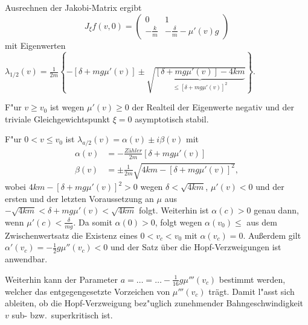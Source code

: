 \documentclass[a4paper, 13pt]{scrreprt}
\theoremstyle{definition} \newtheorem{definition}{Definition}[section]
\newenvironment{beispiel}[1][Beispiel]{\begin{trivlist}
\item[\hskip \labelsep {\bfseries #1}]}{\end{trivlist}}
\begin{document}
\begin{beispiel}[Reibschwinger aus der Mechanik]
Ausrechnen der Jakobi-Matrix ergibt
\[
J_\xi f(v,0)=\begin{pmatrix}
0 & 1\\
-\frac{k}{m} & -\frac{\delta}{m}-\mu'(v)g
\end{pmatrix}
\]
mit Eigenwerten $\lambda_{1\slash2}(v)=\frac{1}{2m}\left\{-[\delta+mg\mu'(v)]\pm\sqrt{\underbrace{[\delta+mg\mu'(v)]-4km}_{\leq[\delta+mg\mu'(v)]^2}}\right\}$.

F"ur $v\geq v_0$ ist wegen $\mu'(v)\geq0$ der Realteil der Eigenwerte negativ und der triviale Gleichgewichtspunkt $\xi=0$ asymptotisch stabil.

F"ur $0<v\leq v_0$ ist $\lambda_{a\slash 2}(v)=\alpha(v)\pm i\beta(v)$ mit
\begin{align*}
\alpha(v)&=-\frac{Zähler}{2m}[\delta+mg\mu'(v)]\\
\beta(v)&=\pm\frac{1}{2m}\sqrt{4km-[\delta+mg\mu'(v)]^2},
\end{align*}
wobei $4km-[\delta+mg\mu'(v)]^2>0$ wegen $\delta<\sqrt{4km}$, $\mu'(v)<0$ und der ersten und der letzten Voraussetzung an $\mu$ aus $-\sqrt{4km}<\delta+mg\mu'(v)<\sqrt{4km}$ folgt. Weiterhin ist $\alpha(c)>0$ genau dann, wenn $\mu'(c)<\frac{\delta}{mg}$. Da somit $\alpha(0)>0$, folgt wegen $\alpha(v_0)\leq$ aus dem Zwischenwertsatz die Existenz eines $0<v_c<v_0$ mit $\alpha(v_c)=0$. Außerdem gilt $\alpha'(v_c)=-\frac{1}{2}g\mu''(v_c)<0$ und der Satz über die Hopf-Verzweigungen ist anwendbar.

Weiterhin kann der Parameter $a=\ldots=\ldots-\frac{1}{16}g\mu'''(v_c)$ bestimmt werden, welcher das entgegengesetzte Vorzeichen von $\mu'''(v_c)$ trägt. Damit l"asst sich ableiten, ob die Hopf-Verzweigung bez"uglich zunehmender Bahngeschwindigkeit $v$ sub- bzw.\ superkritisch ist. 
\end{beispiel}
\end{document}
